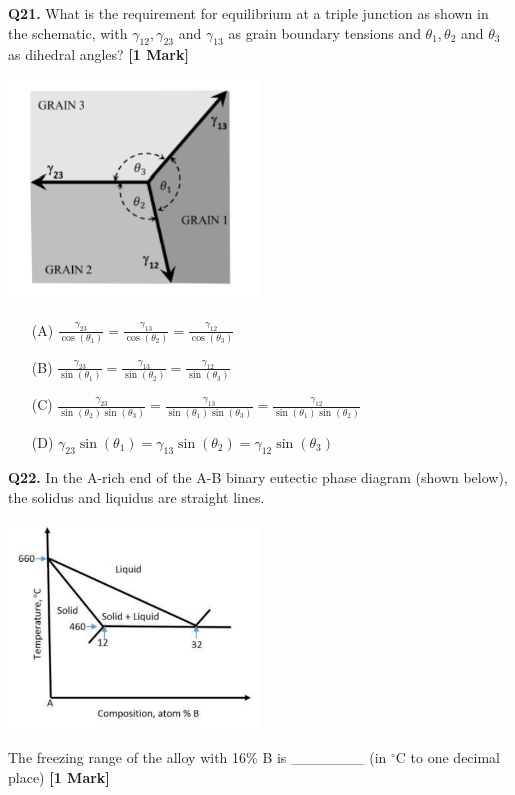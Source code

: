\documentclass[11pt]{article}
\newcommand{\questiona}[2]{
    \noindent\textbf{Q#2.} #1 \hfill \textbf{[1 Mark]}
}
\begin{document}
\questiona{What is the requirement for equilibrium at a triple junction as shown in the schematic, with \(\gamma_{12}, \gamma_{23}\) and \(\gamma_{13}\) as grain boundary tensions and \(\theta_1, \theta_2\) and \(\theta_3\) as dihedral angles?}{21}
\begin{center}
\includegraphics[width=0.5\textwidth]{figures/21.png}
\end{center}
\begin{enumerate}
    \item[(A)] \(\frac{\gamma_{23}}{\cos(\theta_1)} = \frac{\gamma_{13}}{\cos(\theta_2)} = \frac{\gamma_{12}}{\cos(\theta_3)}\)  
    \item[(B)] \(\frac{\gamma_{23}}{\sin(\theta_1)} = \frac{\gamma_{13}}{\sin(\theta_2)} = \frac{\gamma_{12}}{\sin(\theta_3)}\)  
    \item[(C)] \(\frac{\gamma_{23}}{\sin(\theta_2)\sin(\theta_3)} = \frac{\gamma_{13}}{\sin(\theta_1)\sin(\theta_3)} = \frac{\gamma_{12}}{\sin(\theta_1)\sin(\theta_2)}\)  
    \item[(D)] \(\gamma_{23}\sin(\theta_1) = \gamma_{13}\sin(\theta_2) = \gamma_{12}\sin(\theta_3)\)  
\end{enumerate}
\vspace{0.5cm}

\questiona{In the A-rich end of the A-B binary eutectic phase diagram (shown below), the solidus and liquidus are straight lines.
\begin{center}
\includegraphics[width=0.5\textwidth]{figures/22.png}
\end{center}
The freezing range of the alloy with 16\% B is \_\_\_\_\_\_\_ (in \(^\circ\)C to one decimal place)}{22}
\vspace{0.5cm}
\end{document}
